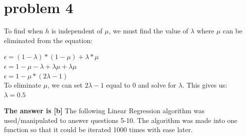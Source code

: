 \documentclass{article}
\begin{document}
\section*{problem 4}
To find when $h$ is independent of $\mu$, we must find the value of $\lambda$ where $\mu$ can be eliminated from the equation:
\begin{center}
    $\epsilon = (1-\lambda) * (1-\mu) + \lambda * \mu$\\
    $\epsilon = 1  - \mu - \lambda + \lambda\mu + \lambda\mu$\\
    $\epsilon = 1 - \mu * (2\lambda - 1)$\\
    To eliminate $\mu$, we can set $2\lambda - 1$ equal to 0 and solve for $\lambda$. This gives us:\\
    $\lambda = 0.5$
\end{center}
\textbf{The answer is [b]}
\newpage
{\Large The following Linear Regression algorithm was used/manipulated to answer questions 5-10. The algorithm was made into one function so that it could be iterated 1000 times with ease later.}
\end{document}

